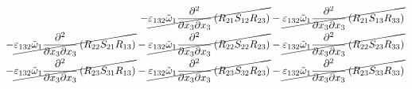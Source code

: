 \begin{equation}
\begin{split}
		-\cancel{\varepsilon_{132}\tilde{\omega}_{1}\pdv{}{x_{3}}{x_{3}}\left(R_{21}S_{12}R_{23}\right)}
		-\cancel{\varepsilon_{132}\tilde{\omega}_{1}\pdv{}{x_{3}}{x_{3}}\left(R_{21}S_{13}R_{33}\right)}\\
		-\cancel{\varepsilon_{132}\tilde{\omega}_{1}\pdv{}{x_{3}}{x_{3}}\left(R_{22}S_{21}R_{13}\right)}
		-\cancel{\varepsilon_{132}\tilde{\omega}_{1}\pdv{}{x_{3}}{x_{3}}\left(R_{22}S_{22}R_{23}\right)}
		-\cancel{\varepsilon_{132}\tilde{\omega}_{1}\pdv{}{x_{3}}{x_{3}}\left(R_{22}S_{23}R_{33}\right)}\\
		-\cancel{\varepsilon_{132}\tilde{\omega}_{1}\pdv{}{x_{3}}{x_{3}}\left(R_{23}S_{31}R_{13}\right)}
		-\cancel{\varepsilon_{132}\tilde{\omega}_{1}\pdv{}{x_{3}}{x_{3}}\left(R_{23}S_{32}R_{23}\right)}
		-\cancel{\varepsilon_{132}\tilde{\omega}_{1}\pdv{}{x_{3}}{x_{3}}\left(R_{23}S_{33}R_{33}\right)}\\
	\end{split}
\end{equation}

